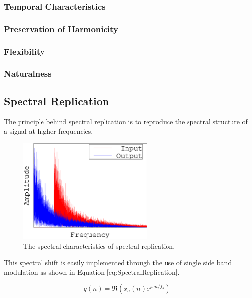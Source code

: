 		\subsubsection*{Temporal Characteristics}
		\subsubsection*{Preservation of Harmonicity}
		\subsubsection*{Flexibility}
		\subsubsection*{Naturalness}

	\subsection{Spectral Replication}
	\label{sec:Excitation-SpectralReplication}
		The principle behind spectral replication is to reproduce the spectral structure of a signal at higher
		frequencies.

		\begin{figure}[h!]
			\centering
			\includegraphics[width=0.6\textwidth]{chapter3/Images/SpectralReplication.eps}
			\caption{The spectral characteristics of spectral replication.}
			\label{fig:SpectralReplication}
		\end{figure}

		This spectral shift is easily implemented through the use of single side band modulation as shown in
		Equation \ref{eq:SpectralReplication}.

		\begin{equation}
			y(n) = \Re \left( x_{a}(n) e^{j\omega  n/ f_{s}} \right)
			\label{eq:SpectralReplication}
		\end{equation}

